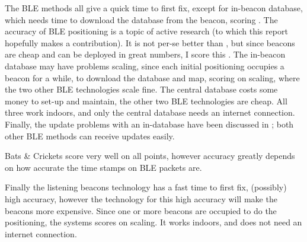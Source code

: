 The BLE methods all give a quick time to first fix, except for in-beacon database, which needs time to download the database from the beacon, scoring \maybe.
The accuracy of BLE positioning is a topic of active research (to which this report hopefully makes a contribution).
It is not per-se better than \wifi, but since beacons are cheap and can be deployed in great numbers, I score this \maybe.
The in-beacon database may have problems scaling, since each initial positioning occupies a beacon for a while, to download the database and map, scoring \maybe on scaling, where the two other BLE technologies scale fine.
The central database costs some money to set-up and maintain, the other two BLE technologies are cheap.
All three work indoors, and only the central database needs an internet connection.
Finally, the update problems with an in-\app database have been discussed in ; both other BLE methods can receive updates easily.

Bats \& Crickets score very well on all points, however accuracy greatly depends on how accurate the time stamps on BLE packets are.

Finally the listening beacons technology has a fast time to first fix, (possibly) high accuracy, however the technology for this high accuracy will make the beacons more expensive.
Since one or more beacons are occupied to do the positioning, the systems scores \maybe on scaling.
It works indoors, and does not need an internet connection.


